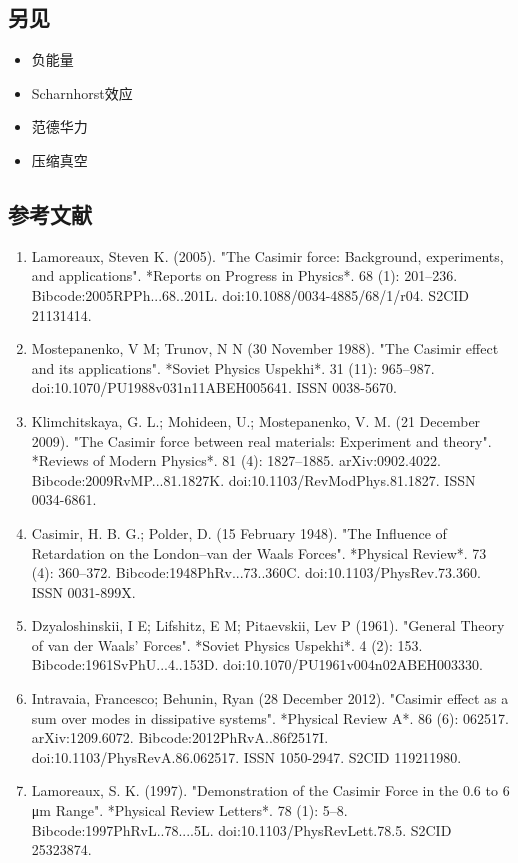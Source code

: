 \subsection{另见}
\begin{itemize}
\item 负能量
\item Scharnhorst效应  
\item 范德华力  
\item 压缩真空
\end{itemize}
\subsection{参考文献}
\begin{enumerate}
\item Lamoreaux, Steven K. (2005). "The Casimir force: Background, experiments, and applications". *Reports on Progress in Physics*. 68 (1): 201–236. Bibcode:2005RPPh...68..201L. doi:10.1088/0034-4885/68/1/r04. S2CID 21131414.
\item Mostepanenko, V M; Trunov, N N (30 November 1988). "The Casimir effect and its applications". *Soviet Physics Uspekhi*. 31 (11): 965–987. doi:10.1070/PU1988v031n11ABEH005641. ISSN 0038-5670.
\item Klimchitskaya, G. L.; Mohideen, U.; Mostepanenko, V. M. (21 December 2009). "The Casimir force between real materials: Experiment and theory". *Reviews of Modern Physics*. 81 (4): 1827–1885. arXiv:0902.4022. Bibcode:2009RvMP...81.1827K. doi:10.1103/RevModPhys.81.1827. ISSN 0034-6861.
\item Casimir, H. B. G.; Polder, D. (15 February 1948). "The Influence of Retardation on the London–van der Waals Forces". *Physical Review*. 73 (4): 360–372. Bibcode:1948PhRv...73..360C. doi:10.1103/PhysRev.73.360. ISSN 0031-899X.
\item Dzyaloshinskii, I E; Lifshitz, E M; Pitaevskii, Lev P (1961). "General Theory of van der Waals' Forces". *Soviet Physics Uspekhi*. 4 (2): 153. Bibcode:1961SvPhU...4..153D. doi:10.1070/PU1961v004n02ABEH003330.
\item Intravaia, Francesco; Behunin, Ryan (28 December 2012). "Casimir effect as a sum over modes in dissipative systems". *Physical Review A*. 86 (6): 062517. arXiv:1209.6072. Bibcode:2012PhRvA..86f2517I. doi:10.1103/PhysRevA.86.062517. ISSN 1050-2947. S2CID 119211980.
\item Lamoreaux, S. K. (1997). "Demonstration of the Casimir Force in the 0.6 to 6 μm Range". *Physical Review Letters*. 78 (1): 5–8. Bibcode:1997PhRvL..78....5L. doi:10.1103/PhysRevLett.78.5. S2CID 25323874.

\end{enumerate}
